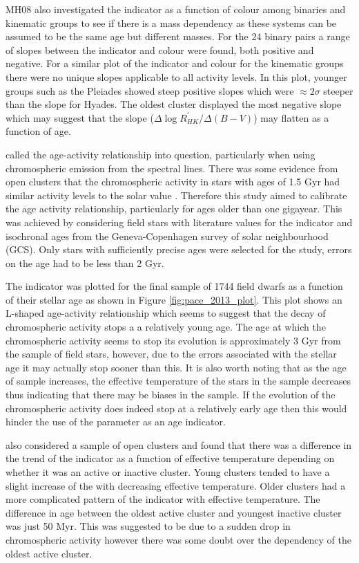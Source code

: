 MH08 also investigated the \Rprime indicator as a function of colour among binaries and kinematic groups to see if there is a mass dependency as these systems can be assumed to be the same age but different masses. For the 24 binary pairs a range of slopes between the \Rprime indicator and colour were found, both positive and negative. For a similar plot of the \Rprime indicator and colour for the kinematic groups there were no unique slopes applicable to all activity levels. In this plot, younger groups such as the Pleiades showed steep positive slopes which were $\approx 2\sigma$ steeper than the slope for Hyades. The oldest cluster displayed the most negative slope which may suggest that the slope ($\Delta\log R^{'}_{HK} / \Delta(B- V)$) may flatten as a function of age.

\citet{Pace_2013} called the age-activity relationship into question, particularly when using chromospheric emission from the \caII spectral lines. There was some evidence from open clusters that the chromospheric activity in stars with ages of 1.5 Gyr had similar activity levels to the solar value \citep{Pace_Pasquini_2004}. Therefore this study aimed to calibrate the age activity relationship, particularly for ages older than one gigayear. This was achieved by considering field stars with literature values for the \Rprime indicator and isochronal ages from the Geneva-Copenhagen survey of solar neighbourhood (GCS). Only stars with sufficiently precise ages were selected for the study, errors on the age had to be less than 2 Gyr.

The \Rprime indicator was plotted for the final sample of 1744 field dwarfs as a function of their stellar age as shown in Figure \ref{fig:pace_2013_plot}. This plot shows an L-shaped age-activity relationship which seems to suggest that the decay of chromospheric activity stops a a relatively young age. The age at which the chromospheric activity seems to stop its evolution is approximately 3 Gyr from the sample of field stars, however, due to the errors associated with the stellar age it may actually stop sooner than this. It is also worth noting that as the age of sample increases, the effective temperature of the stars in the sample decreases thus indicating that there may be biases in the sample. If the evolution of the chromospheric activity does indeed stop at a relatively early age then this would hinder the use of the parameter as an age indicator.

\citet{Pace_2013} also considered a sample of open clusters and found that there was a difference in the trend of the \Rprime indicator as a function of effective temperature depending on whether it was an active or inactive cluster. Young clusters tended to have a slight increase of the \Rprime with decreasing effective temperature. Older clusters had a more complicated pattern of the \Rprime indicator with effective temperature. The difference in age between the oldest active cluster and youngest inactive cluster was just 50 Myr. This was suggested to be due to a sudden drop in chromospheric activity however there was some doubt over the dependency of the oldest active cluster.

